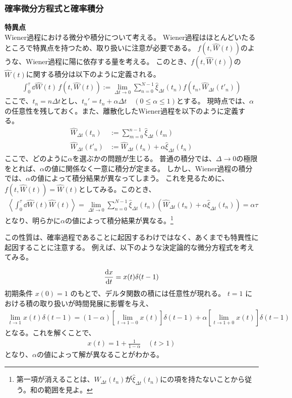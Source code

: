 \documentclass[a4paper,11pt]{jsarticle}
\numberwithin{equation}{section}
\begin{document}
\subsubsection{確率微分方程式と確率積分}
\textbf{特異点}\\
Wiener過程における微分や積分について考える。
Wiener過程はほとんどいたるところで特異点を持つため、取り扱いに注意が必要である。
$f(t,\hat{W}(t))$のような、Wiener過程に陽に依存する量を考える。
このとき、$f(t,\hat{W}(t))$の$\hat{W}(t)$に関する積分は以下のように定義される。
\begin{align}
\int_0^\tau \dd{\hat{W}(t)}\, f(t, \hat{W}(t)) := \lim_{\Delta t \to 0} \sum_{n=0}^{N-1} \hat{\xi}_{\Delta t}(t_n) f(t_n, \hat{W}_{\Delta t}(t'_n)) 
\end{align}
ここで、$t_n = n\Delta t$とし、$t_{n}'=t_{n} + \alpha \Delta t\quad (0\leq \alpha \leq 1)$とする。
現時点では、$\alpha$の任意性を残しておく。また、離散化したWiener過程を以下のように定義する。
\begin{align}
\hat{W}_{\Delta t}(t_n) &:= \sum_{m=0}^{n-1} \hat{\xi}_{\Delta t}(t_m) \\
\hat{W}_{\Delta t}(t'_n) &:= \hat{W}_{\Delta t}(t_n) + \alpha \hat{\xi}_{\Delta t}(t_n)
\end{align}
ここで、どのように$\alpha$を選ぶかの問題が生じる。
普通の積分では、$\Delta \to 0$の極限をとれば、$\alpha$の値に関係なく一意に積分が定まる。
しかし、Wiener過程の積分では、$\alpha$の値によって積分結果が異なってしまう。
これを見るために、$f(t,\hat{W}(t)) = \hat{W}(t)$としてみる。このとき、
\begin{align}
\left\langle \int_0^\tau \dd{\hat{W}(t)} \hat{W}(t) \right\rangle 
= \lim_{\Delta t \to 0} \sum_{n=0}^{N-1} \hat{\xi}_{\Delta t}(t_n) \left( \hat{W}_{\Delta t}(t_n) + \alpha \hat{\xi}_{\Delta t}(t_n) \right)
= \alpha \tau
\end{align}
となり、明らかに$\alpha$の値によって積分結果が異なる。\footnote{第一項が消えることは、$\hat{W}_{\Delta t}(t_n)$が$\hat{\xi}_{\Delta t}(t_n)$にの項を持たないことから従う。和の範囲を見よ。}

この性質は、確率過程であることに起因するわけではなく、あくまでも特異性に起因することに注意する。
例えば、以下のような決定論的な微分方程式を考えてみる。

\begin{align}
\dv{x}{t} = x(t)\delta(t - 1)
\end{align}
初期条件 $x(0) = 1$ のもとで、デルタ関数の積には任意性が現れる。
$t = 1$ における積の取り扱いが時間発展に影響を与え、
\begin{align}
\lim_{t \to 1} x(t)\delta(t - 1)
= (1 - \alpha) \left[ \lim_{t \to 1 - 0} x(t) \right] \delta(t - 1)
+ \alpha \left[ \lim_{t \to 1 + 0} x(t) \right] \delta(t - 1)
\end{align}
となる。これを解くことで、
\begin{align}
  x(t) = 1 + \frac{1}{1 - \alpha} \quad (t > 1)
\end{align}
となり、$\alpha$の値によって解が異なることがわかる。
\end{document}
